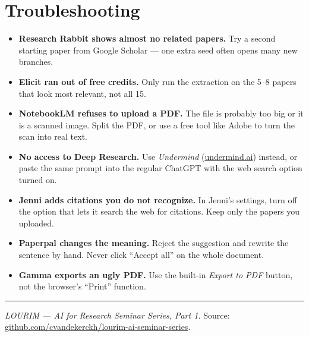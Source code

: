 \documentclass[11pt,a4paper]{article}
\begin{document}
\section{Troubleshooting}
\label{app:troubleshoot}

\begin{itemize}[leftmargin=*, itemsep=2pt]
  \item \textbf{Research Rabbit shows almost no related papers.} Try a second starting paper from Google Scholar --- one extra seed often opens many new branches.
  \item \textbf{Elicit ran out of free credits.} Only run the extraction on the 5--8 papers that look most relevant, not all 15.
  \item \textbf{NotebookLM refuses to upload a PDF.} The file is probably too big or it is a scanned image. Split the PDF, or use a free tool like Adobe to turn the scan into real text.
  \item \textbf{No access to Deep Research.} Use \emph{Undermind} (\href{https://undermind.ai/}{undermind.ai}) instead, or paste the same prompt into the regular ChatGPT with the web search option turned on.
  \item \textbf{Jenni adds citations you do not recognize.} In Jenni's settings, turn off the option that lets it search the web for citations. Keep only the papers you uploaded.
  \item \textbf{Paperpal changes the meaning.} Reject the suggestion and rewrite the sentence by hand. Never click ``Accept all'' on the whole document.
  \item \textbf{Gamma exports an ugly PDF.} Use the built-in \emph{Export to PDF} button, not the browser's ``Print'' function.
\end{itemize}

\vspace{1em}
\hrule
\vspace{0.5em}
\small \textit{LOURIM --- AI for Research Seminar Series, Part 1.} Source: \href{https://github.com/cvandekerckh/lourim-ai-seminar-series}{github.com/cvandekerckh/lourim-ai-seminar-series}.
\end{document}
